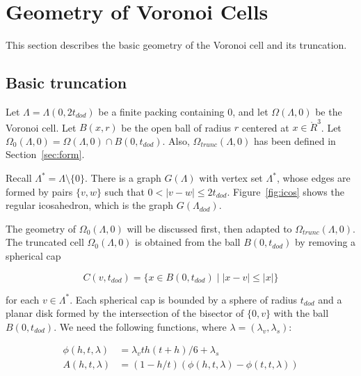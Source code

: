 \documentclass{article} %
\begin{document}
\section{Geometry of Voronoi Cells}

This section describes the basic geometry of the Voronoi cell and its
truncation.

\subsection{Basic truncation}
\label{sec:in-ex}

Let $\Lambda = \Lambda(0,2t_{dod})$ be a finite packing containing
$0$, and let $\Omega(\Lambda,0)$ be the Voronoi cell. Let $B(x,r)$ be
the open ball of radius $r$ centered at $x\in\ring{R}^3$. Let
$\Omega_0(\Lambda,0) = \Omega(\Lambda,0)\cap B(0,t_{dod})$. Also,
$\Omega_{trunc}(\Lambda,0)$ has been defined in
Section~\ref{sec:form}.

Recall $\Lambda^* = \Lambda\setminus\{0\}$.  There is a graph $G(\Lambda)$
with vertex set $\Lambda^*$, whose edges are formed by pairs
$\{v,w\}$ such that $0<|v-w|\le 2t_{dod}$.  Figure~\ref{fig:icos}
shows the regular icosahedron, which is the graph $G(\Lambda_{dod})$.

\begin{floatingfigure}{30mm}
  \begin{center}
  \end{center}
  \caption{}
  \label{fig:icos}
\end{floatingfigure}

The geometry of $\Omega_0(\Lambda,0)$ will be discussed first,
then adapted to $\Omega_{trunc}(\Lambda,0)$.  The truncated cell
$\Omega_0(\Lambda,0)$ is obtained from the ball $B(0,t_{dod})$ by
removing a spherical cap

$$
C(v,t_{dod}) = \{x \in B(0,t_{dod}) \mid  |x - v| \le |x| \}
$$

\noindent for each $v\in\Lambda^*$.
Each spherical cap is bounded by a sphere of radius $t_{dod}$ and
a planar disk formed by the intersection of the bisector of 
$\{0,v\}$ with the ball $B(0,t_{dod})$.
We need the following functions, where $\lambda=(\lambda_v,\lambda_s)$:

\begin{equation}
  \begin{array}{lll}
    \phi(h,t,\lambda) &= \lambda_v t h (t+h)/6 + \lambda_s\\
    A(h,t,\lambda) &= (1-h/t)(\phi(h,t,\lambda)-\phi(t,t,\lambda))\\
  \end{array}
\end{equation}
\end{document}
